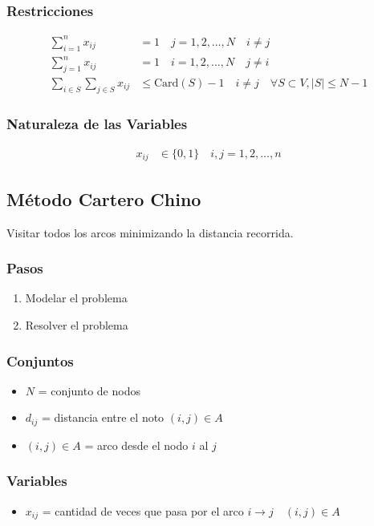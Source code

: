 \documentclass{article}
\begin{document}
\subsubsection*{Restricciones}
\begin{align}
    \sum_{i=1}^{n} x_{ij} &= 1 \quad j = 1, 2, \ldots, N \quad i \neq j \\
    \sum_{j=1}^{n} x_{ij} &= 1 \quad i = 1, 2, \ldots, N \quad j \neq i \\
    \sum_{i \in S} \sum_{j \in S} x_{ij} &\leq \text{Card}(S)-1 \quad i\neq j\quad \forall S \subset V, |S| \leq N-1
\end{align}
\subsubsection*{Naturaleza de las Variables}
\begin{align}
    x_{ij} &\in \{0, 1\} \quad i, j = 1, 2, \ldots, n
\end{align}

\subsection*{Método Cartero Chino}
Visitar todos los arcos minimizando la distancia recorrida.

\subsubsection*{Pasos}
\begin{enumerate}
    \item Modelar el problema
    \item Resolver el problema
\end{enumerate}
\subsubsection*{Conjuntos}
\begin{itemize}
    \item \(N\) = conjunto de nodos
    \item \(d_{ij}\) = distancia entre el noto \((i,j)\in A\)
    \item \((i,j)\in A\) = arco desde el nodo \(i\) al \(j\)
\end{itemize}
\subsubsection*{Variables}
\begin{itemize}
    \item \(x_{ij}\) = cantidad de veces que pasa por el arco \(i\rightarrow j\quad (i,j)\in A\)
\end{itemize}
\end{document}
